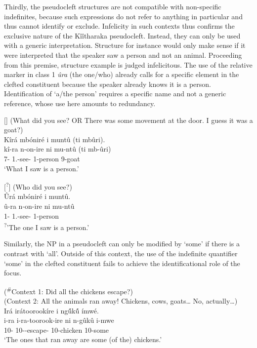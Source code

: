 \documentclass[output=paper]{langscibook}
\begin{document}
\z

Thirdly, the pseudocleft structures are not compatible with non-specific indefinites, because such expressions do not refer to anything in particular and thus cannot identify or exclude. Infelicity in such contexts thus confirms the exclusive nature of the Kîîtharaka pseudocleft. Instead, they can only be used with a generic interpretation. Structure  for instance would only make sense if it were interpreted that the speaker saw a person and not an animal. Proceeding from this premise, structure example  is judged infelicitous. The use of the relative marker in class 1 \textit{ûra} (the one/who) already calls for a specific element in the clefted constituent because the speaker already knows it is a person. Identification of ‘a/the person’ requires a specific name and not a generic reference, whose use here amounts to redundancy.

\ea
[]{
\label{ex:kth:seeperson}
(What did you see? OR There was some movement at the door. I guess it was a goat?)\\
Kîrá mbóniré i muntû (ti mbûri).\\
\gll
kî-ra  n-on-ire  ni  mu-ntû  (ti  mb-ûri)\\
7-\RM{} 1\SG.\SM{}-see-\PFV{} \COP{} 1-person {\db}\NEG{} 9-goat\\
\glt
‘What I saw is a person.’
}

\z

\ea
[\textsuperscript{?}]{
\label{bkm:Ref111647873}
(Who did you see?)\\
Ûrá mbóniré i muntû.\\
\gll
û-ra  n-on-ire  ni  mu-ntû\\
1-\RM{} 1\SG.\SM{}-see-\PFV{}  \COP{} 1-person\\
\glt
\textsuperscript{?}’The one I saw is a person.’
}

\z


Similarly, the NP in a pseudocleft can only be modified by ‘some’ if there is a contrast with ‘all’. Outside of this context, the use of the indefinite quantifier ‘some’ in the clefted constituent fails to achieve the identificational role of the focus.

\ea
(\textsuperscript{\#}Context 1: Did all the chickens escape?) \\
(Context 2: All the animals ran away! Chickens, cows, goats… No, actually…)\\
Irá irátoorookíre i ngû́kû́ ímwé.\\
\gll
i-ra  i-ra-toorook-ire  ni  n-gûkû  i-mwe\\
10-\RM{} 10\SM{}-\YPST{}-escape-\PFV{} \COP{} 10-chicken  10-some\\
\glt ‘The ones that ran away are some (of the) chickens.’
\end{document}
